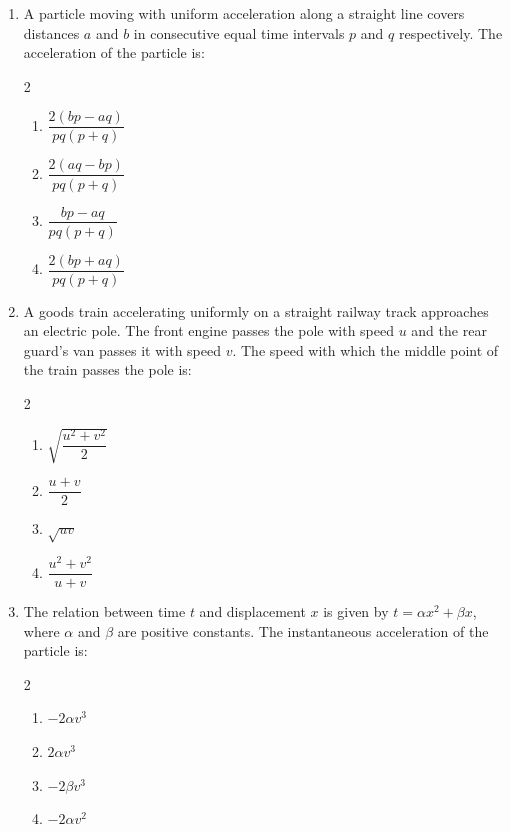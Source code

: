 \documentclass[11pt,a4paper]{article}
\begin{document}
\begin{enumerate}[label=\textbf{\textcolor{l2Amber}{Q\arabic*.}},leftmargin=24pt,itemsep=10pt,start=26]
  \item A particle moving with uniform acceleration along a straight line covers distances $a$ and $b$ in consecutive equal time intervals $p$ and $q$ respectively. The acceleration of the particle is:
  \begin{multicols}{2}
  \begin{enumerate}[label=\textbf{\textcolor{primaryDark}{(\Alph*)}},itemsep=2pt]
    \item $\dfrac{2(bp - aq)}{pq(p + q)}$
    \item $\dfrac{2(aq - bp)}{pq(p + q)}$
    \item $\dfrac{bp - aq}{pq(p + q)}$
    \item $\dfrac{2(bp + aq)}{pq(p + q)}$
  \end{enumerate}
  \end{multicols}

  \item A goods train accelerating uniformly on a straight railway track approaches an electric pole. The front engine passes the pole with speed $u$ and the rear guard's van passes it with speed $v$. The speed with which the middle point of the train passes the pole is:
  \begin{multicols}{2}
  \begin{enumerate}[label=\textbf{\textcolor{primaryDark}{(\Alph*)}},itemsep=2pt]
    \item $\sqrt{\dfrac{u^2 + v^2}{2}}$
    \item $\dfrac{u + v}{2}$
    \item $\sqrt{uv}$
    \item $\dfrac{u^2 + v^2}{u + v}$
  \end{enumerate}
  \end{multicols}

  \item The relation between time $t$ and displacement $x$ is given by $t = \alpha x^2 + \beta x$, where $\alpha$ and $\beta$ are positive constants. The instantaneous acceleration of the particle is:
  \begin{multicols}{2}
  \begin{enumerate}[label=\textbf{\textcolor{primaryDark}{(\Alph*)}},itemsep=2pt]
    \item $-2\alpha v^3$
    \item $2\alpha v^3$
    \item $-2\beta v^3$
    \item $-2\alpha v^2$
  \end{enumerate}
  \end{multicols}


\end{enumerate}
\end{document}
